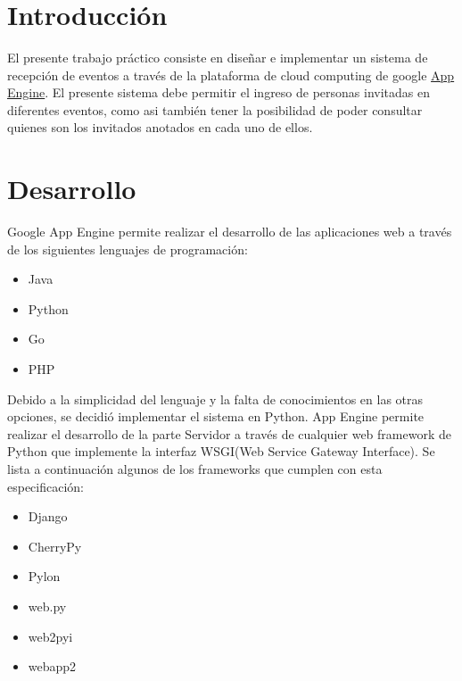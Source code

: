 \documentclass[a4paper,10pt]{article}
\title{  }
\begin{document}
	\maketitle %
	\newpage

	\tableofcontents 
	\newpage

	\section{Introducción}
		El presente trabajo práctico consiste en diseñar e implementar un sistema de recepción de eventos a través
        de la plataforma de cloud computing de google \href{http://cloud.google.com/appengine}{App Engine}. El
        presente sistema debe permitir el ingreso de personas invitadas en diferentes eventos, como asi también
        tener la posibilidad de poder consultar quienes son los invitados anotados en cada uno de ellos.
          
         
    \section{Desarrollo}
        Google App Engine permite realizar el desarrollo de las aplicaciones web a través de los siguientes 
        lenguajes de programación:

        \begin{itemize}
            \item Java
            \item Python
            \item Go
            \item PHP
        \end{itemize}

        Debido a la simplicidad del lenguaje y la falta de conocimientos en las otras opciones, se decidió implementar
        el sistema en Python. App Engine permite realizar el desarrollo de la parte Servidor a través de cualquier
        web framework de Python que implemente la interfaz WSGI(Web Service Gateway Interface). Se lista a continuación
        algunos de los frameworks que cumplen con esta especificación:
        
        \begin{itemize}
            \item Django
            \item CherryPy
            \item Pylon 
            \item web.py
            \item web2pyi
            \item webapp2
        \end{itemize}
\end{document}
